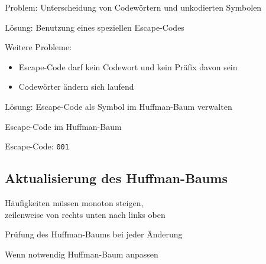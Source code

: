 \documentclass[xcolor=dvipsnames,presentation]{beamer}    %
\newenvironment{witemize}{\itemize\setlength{\itemsep}{1em}}{\enditemize}
\begin{document}
\begin{frame}{\insertsection}
  \begin{witemize}
    \item Problem: Unterscheidung von Codewörtern und unkodierten
      Symbolen
    \item Lösung: Benutzung eines speziellen Escape-Codes
    \item Weitere Probleme:
      \begin{itemize}
      \item Escape-Code darf kein Codewort und kein Präfix davon sein
      \item Codewörter ändern sich laufend
      \end{itemize}
    \item Lösung: Escape-Code als Symbol im Huffman-Baum verwalten
  \end{witemize}
\end{frame}

\begin{frame}[<+->]{Escape-Code im Huffman-Baum}
\begin{figure}
\end{figure}
Escape-Code: {\tt001}
\end{frame}

\subsection{Aktualisierung des Huffman-Baums}

\begin{frame}{\insertsubsection}
  \begin{witemize}
  \item Häufigkeiten müssen monoton steigen, \\
    zeilenweise von rechts unten nach links oben
  \item Prüfung des Huffman-Baums bei jeder Änderung
  \item Wenn notwendig Huffman-Baum anpassen
  \end{witemize}
\end{frame}
\end{document}
